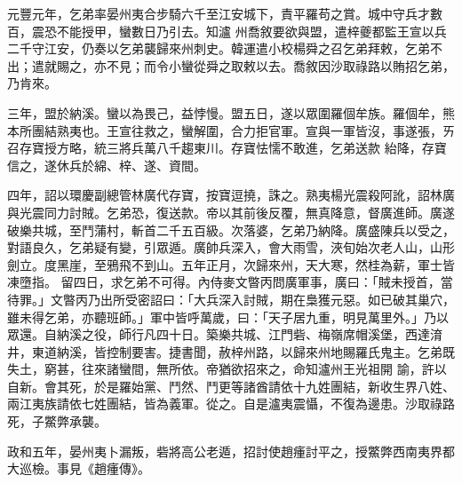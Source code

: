 \begin{pinyinscope}
 元豐元年，乞弟率晏州夷合步騎六千至江安城下，責平羅苟之賞。城中守兵才數百，震恐不能授甲，蠻數日乃引去。知瀘
 州喬敘要欲與盟，遣梓夔都監王宣以兵二千守江安，仍奏以乞弟襲歸來州刺史。韓運遣小校楊舜之召乞弟拜敕，乞弟不出；遣就賜之，亦不見；而令小蠻從舜之取敕以去。喬敘因沙取祿路以賄招乞弟，乃肯來。



 三年，盟於納溪。蠻以為畏己，益悖慢。盟五日，遂以眾圍羅個牟族。羅個牟，熊本所團結熟夷也。王宣往救之，蠻解圍，合力拒官軍。宣與一軍皆沒，事遂張，ㄞ召存寶授方略，統三將兵萬八千趨東川。存寶怯懦不敢進，乞弟送款
 紿降，存寶信之，遂休兵於綿、梓、遂、資間。



 四年，詔以環慶副總管林廣代存寶，按寶逗撓，誅之。熟夷楊光震殺阿訛，詔林廣與光震同力討賊。乞弟恐，復送款。帝以其前後反覆，無真降意，督廣進師。廣遂破樂共城，至鬥蒲村，斬首二千五百級。次落婆，乞弟乃納降。廣盛陳兵以受之，對語良久，乞弟疑有變，引眾遁。廣帥兵深入，會大雨雪，浹旬始次老人山，山形劍立。度黑崖，至鴉飛不到山。五年正月，次歸來州，天大寒，然桂為薪，軍士皆凍墮指。
 留四日，求乞弟不可得。內侍麥文暼丙問廣軍事，廣曰：「賊未授首，當待罪。」文暼丙乃出所受密詔曰：「大兵深入討賊，期在梟獲元惡。如已破其巢穴，雖未得乞弟，亦聽班師。」軍中皆呼萬歲，曰：「天子居九重，明見萬里外。」乃以眾還。自納溪之役，師行凡四十日。築樂共城、江門砦、梅嶺席帽溪堡，西達淯井，東道納溪，皆控制要害。捷書聞，赦梓州路，以歸來州地賜羅氏鬼主。乞弟既失土，窮甚，往來諸蠻間，無所依。帝猶欲招來之，命知瀘州王光祖開
 諭，許以自新。會其死，於是羅始黨、鬥然、鬥更等諸酋請依十九姓團結，新收生界八姓、兩江夷族請依七姓團結，皆為義軍。從之。自是瀘夷震懾，不復為邊患。沙取祿路死，子鱉弊承襲。



 政和五年，晏州夷卜漏叛，砦將高公老遁，招討使趙瘇討平之，授鱉弊西南夷界都大巡檢。事見《趙瘇傳》。



\end{pinyinscope}